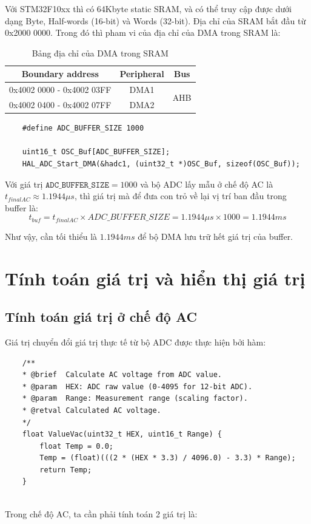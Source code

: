 Với STM32F10xx thì có 64Kbyte static SRAM, và có thể truy cập được dưới dạng Byte, Half-words (16-bit) và Words (32-bit). Địa chỉ của SRAM bắt đầu từ 0x2000 0000. Trong đó thì pham vi của địa chỉ của DMA trong SRAM là:

\begin{table}[H]
	\centering
	\begin{tabular}{|c|c|c|}
		\hline
		Boundary address & Peripheral & Bus \\
		\hline
		0x4002 0000 - 0x4002 03FF & DMA1 & \multirow{2}{*}{AHB} \\
		\cline{1 - 2}
		0x4002 0400 - 0x4002 07FF & DMA2 & \\
		\hline
	\end{tabular}
	\caption{Bảng địa chỉ của DMA trong SRAM}
	\label{t_address DMA in SRAM}
\end{table}



\begin{lstlisting}
	#define ADC_BUFFER_SIZE 1000
	
	uint16_t OSC_Buf[ADC_BUFFER_SIZE];
	HAL_ADC_Start_DMA(&hadc1, (uint32_t *)OSC_Buf, sizeof(OSC_Buf));
\end{lstlisting}

Với giá trị $\texttt{ADC\_BUFFER\_SIZE} = 1000$ và bộ ADC lấy mẫu ở chế độ AC là $t_{finalAC} \approx 1.1944 \mu s$, thì giá trị mà để đưa con trỏ về lại vị trí ban đầu trong buffer là: \[ t_{buf} = t_{finalAC} \times ADC\_BUFFER\_SIZE = 1.1944\mu s \times 1000 = 1.1944ms \]

Như vậy, cần tối thiểu là $1.1944ms$ để bộ DMA lưu trữ hết giá trị của buffer.

\section{Tính toán giá trị và hiển thị giá trị}
\subsection{Tính toán giá trị ở chế độ AC}

Giá trị chuyển đổi giá trị thực tế từ bộ ADC được thực hiện bởi hàm:
\begin{lstlisting}
	/**
	* @brief  Calculate AC voltage from ADC value.
	* @param  HEX: ADC raw value (0-4095 for 12-bit ADC).
	* @param  Range: Measurement range (scaling factor).
	* @retval Calculated AC voltage.
	*/
	float ValueVac(uint32_t HEX, uint16_t Range) {
		float Temp = 0.0;
		Temp = (float)(((2 * (HEX * 3.3) / 4096.0) - 3.3) * Range);
		return Temp;
	}
	
\end{lstlisting}
 Trong chế độ AC, ta cần phải tính toán 2 giá trị là:
 
